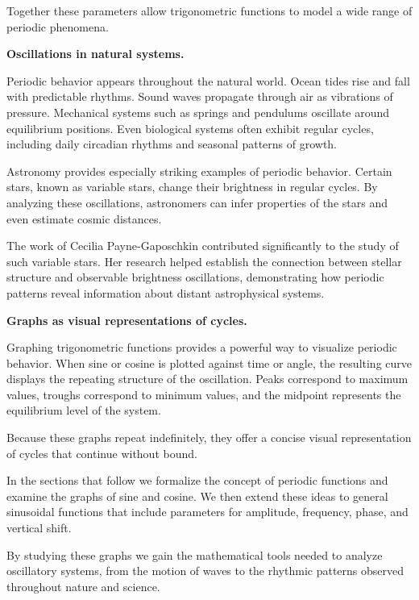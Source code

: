 \documentclass[11pt, openany]{book}
\theoremstyle{plain}
\theoremstyle{definition}
\theoremstyle{remark}
\begin{document}
Together these parameters allow trigonometric functions to model a wide
range of periodic phenomena.

\medskip

\textbf{Oscillations in natural systems.}

Periodic behavior appears throughout the natural world. Ocean tides rise
and fall with predictable rhythms. Sound waves propagate through air as
vibrations of pressure. Mechanical systems such as springs and pendulums
oscillate around equilibrium positions. Even biological systems often
exhibit regular cycles, including daily circadian rhythms and seasonal
patterns of growth.

Astronomy provides especially striking examples of periodic behavior.
Certain stars, known as variable stars, change their brightness in
regular cycles. By analyzing these oscillations, astronomers can infer
properties of the stars and even estimate cosmic distances.

The work of Cecilia Payne-Gaposchkin contributed significantly to the
study of such variable stars. Her research helped establish the
connection between stellar structure and observable brightness
oscillations, demonstrating how periodic patterns reveal information
about distant astrophysical systems.

\medskip

\textbf{Graphs as visual representations of cycles.}

Graphing trigonometric functions provides a powerful way to visualize
periodic behavior. When sine or cosine is plotted against time or angle,
the resulting curve displays the repeating structure of the oscillation.
Peaks correspond to maximum values, troughs correspond to minimum
values, and the midpoint represents the equilibrium level of the
system.

Because these graphs repeat indefinitely, they offer a concise visual
representation of cycles that continue without bound.

\medskip

In the sections that follow we formalize the concept of periodic
functions and examine the graphs of sine and cosine. We then extend
these ideas to general sinusoidal functions that include parameters for
amplitude, frequency, phase, and vertical shift.

By studying these graphs we gain the mathematical tools needed to
analyze oscillatory systems, from the motion of waves to the rhythmic
patterns observed throughout nature and science.
\end{document}
